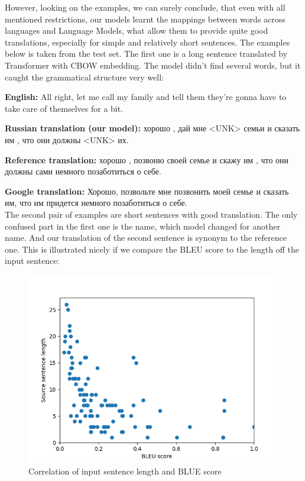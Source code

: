 \documentclass{article}
\begin{document}
However, looking on the examples, we can surely conclude, that even with all mentioned restrictions, our models learnt the mappings between words across languages and Language Models, what allow them to provide quite good translations, especially for simple and relatively short sentences. The examples below is taken from the test set. The first one is a long sentence translated by Transformer with CBOW embedding. The model didn't find several words, but it caught the grammatical structure very well:

\textbf{English:} All right, let me call my family and tell them they're gonna have to take care of themselves for a bit.

\textbf{Russian translation (our model):} хорошо , дай мне <UNK> семьи и сказать им , что они должны <UNK> их.

\textbf{Reference translation:} хорошо , позвоню своей семье и скажу им , что они должны сами немного позаботиться о себе.

\textbf{Google translation:} Хорошо, позвольте мне позвонить моей семье и сказать им, что им придется немного позаботиться о себе.\\

The second pair of examples are short sentences with good translation. The only confused part in the first one is the name, which model changed for another name. And our translation of the second sentence is synonym to the reference one. This is illustrated nicely if we compare the BLEU score to the length off the input sentence:

\begin{figure}
    \centering
    \includegraphics[width=\textwidth]{imgs/rnn_en_ru_VM_w2v_en_d100_sg_st_VM_w2v_ru_d100_sg_st_length_score.png}
    \caption{Correlation of input sentence length and BLUE score}
    \label{fig:scores_lens}
\end{figure}
\end{document}
